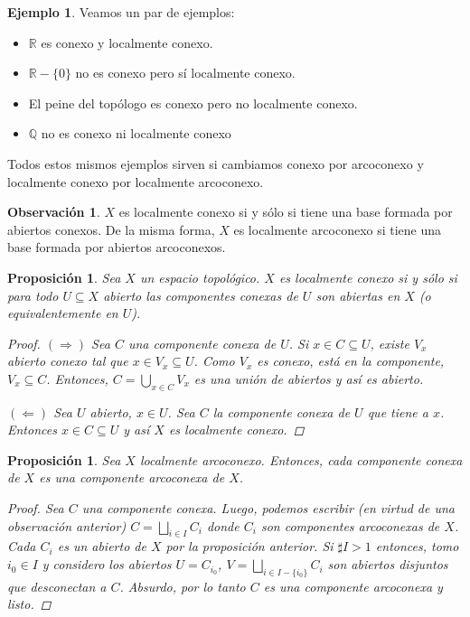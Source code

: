 \documentclass[12pt]{book}
\newtheorem{prop}[teo]{Proposición}
\theoremstyle{definition}
\newtheorem{obs}[teo]{Observación}
\newtheorem{ex}[teo]{Ejemplo}
\newcommand{\RR}{\mathbb{R}}      %
\newcommand{\QQ}{\mathbb{Q}}
\begin{document}
\begin{ex} Veamos un par de ejemplos:
\begin{itemize}
\item $\RR$ es conexo y localmente conexo.
\item $\RR-\{0\}$ no es conexo pero sí localmente conexo.
\item El peine del topólogo es conexo pero no localmente conexo.
\item $\QQ$ no es conexo ni localmente conexo
\end{itemize}
Todos estos mismos ejemplos sirven si cambiamos conexo por arcoconexo y localmente conexo por localmente arcoconexo.
\end{ex}

\begin{obs}
$X$ es localmente conexo si y sólo si tiene una base formada por abiertos conexos. De la misma forma, $X$ es localmente arcoconexo si tiene una base formada por abiertos arcoconexos.
\end{obs}

\begin{prop}
Sea $X$ un espacio topológico. $X$ es localmente conexo si y sólo si para todo $U\subseteq X$ abierto las componentes conexas de $U$ son abiertas en $X$ (o equivalentemente en $U$).
\begin{proof}
$(\Longrightarrow)$ Sea $C$ una componente conexa de $U$. Si $x\in C\subseteq U$, existe $V_x$ abierto conexo tal que $x\in V_x\subseteq U$. Como $V_x$ es conexo, está en la componente, $V_x\subseteq C$. Entonces, $C=\displaystyle\bigcup_{x\in C}V_x$ es una unión de abiertos y así es abierto.

$(\Longleftarrow)$ Sea $U$ abierto, $x\in U$. Sea $C$ la componente conexa de $U$ que tiene a $x$. Entonces $x\in C\subseteq U$ y así $X$ es localmente conexo.
\end{proof}
\end{prop}

\begin{prop}
Sea $X$ localmente arcoconexo. Entonces, cada componente conexa de $X$ es una componente arcoconexa de $X$.
\begin{proof}
Sea $C$ una componente conexa. Luego, podemos escribir (en virtud de una observación anterior) $C=\displaystyle\bigsqcup_{i\in I}C_i$ donde $C_i$ son componentes arcoconexas de $X$. Cada $C_i$ es un abierto de $X$ por la proposición anterior. Si $\sharp I > 1$ entonces, tomo $i_0\in I$ y considero los abiertos $U=C_{i_0}$, $V=\displaystyle\bigsqcup_{i\in I -\{i_0\}} C_i$ son abiertos disjuntos que desconectan a $C$. Absurdo, por lo tanto $C$ es una componente arcoconexa y listo.
\end{proof}
\end{prop}
\end{document}
